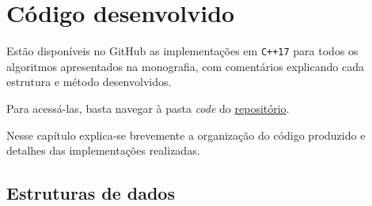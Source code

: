 \chapter{Código desenvolvido}

Estão disponíveis no GitHub as implementações em \texttt{C++17} para todos os algoritmos apresentados na monografia, com comentários explicando cada estrutura e método desenvolvidos.

Para acessá-las, basta navegar à pasta \textit{code} do \href{github.com/gafeol/chinese-postman/}{repositório}.

Nesse capítulo explica-se brevemente a organização do código produzido e detalhes das implementações realizadas.

\section{Estruturas de dados}

